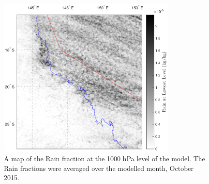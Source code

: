 \begin{figure}[!hbt]
    \centering
    \includegraphics[width=0.8\textwidth]{Fig/Research/CCAM/TimeAveragedMap_qrg.eps}
    \vspace{-1cm}
    \caption{ A map of the Rain fraction at the 1000 hPa level of the model. The Rain fractions were averaged over the modelled month, October 2015. }
    \label{fig:rainmap}
\end{figure}


